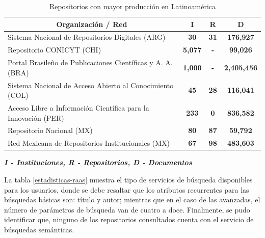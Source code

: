 \begin{table}[htbp]
\caption{Repositorios con mayor producci\'on en Latinoam\'erica}
\begin{tabular}{| p{9.5cm}| p{1.5cm} | p{1.5cm} | p{1.5cm} |}
\hline
\multicolumn{1}{|c|}{\textbf{Organizaci\'on / Red}}                                    & \multicolumn{1}{c|}{\textbf{I}}     & \multicolumn{1}{c|}{\textbf{R}}  & \multicolumn{1}{c|}{\textbf{D}}         \\ \hline
\multicolumn{1}{|l|}{Sistema Nacional de  Repositorios Digitales (ARG)}              & \multicolumn{1}{c|}{\textbf{30}}    & \multicolumn{1}{c|}{\textbf{31}} & \multicolumn{1}{c|}{\textbf{176,927}}   \\ \hline
\multicolumn{1}{|l|}{Repositorio CONICYT (CHI)}                                      & \multicolumn{1}{c|}{\textbf{5,077}} & \multicolumn{1}{c|}{\textbf{-}}  & \multicolumn{1}{c|}{\textbf{99,026}}    \\ \hline
\multicolumn{1}{|l|}{Portal Brasileño de  Publicaciones Cient\'ificas y  A. A. (BRA)}  & \multicolumn{1}{c|}{\textbf{1,000}} & \multicolumn{1}{c|}{\textbf{-}}  & \multicolumn{1}{c|}{\textbf{2,405,456}} \\ \hline
\multicolumn{1}{|l|}{Sistema Nacional de  Acceso Abierto al Conocimiento (COL)}      & \multicolumn{1}{c|}{\textbf{45}}    & \multicolumn{1}{c|}{\textbf{28}} & \multicolumn{1}{c|}{\textbf{116,041}}   \\ \hline
\multicolumn{1}{|l|}{Acceso Libre a Informaci\'on Cient\'ifica para la Innovaci\'on (PER)} & \multicolumn{1}{c|}{\textbf{233}}   & \multicolumn{1}{c|}{\textbf{0}}  & \multicolumn{1}{c|}{\textbf{836,582}}   \\ \hline
\multicolumn{1}{|l|}{Repositorio Nacional (MX)}                                      & \multicolumn{1}{c|}{\textbf{80}}    & \multicolumn{1}{c|}{\textbf{87}} & \multicolumn{1}{c|}{\textbf{59,792}}    \\ \hline
\multicolumn{1}{|l|}{Red Mexicana de  Repositorios Institucionales (MX)}             & \multicolumn{1}{c|}{\textbf{67}}    & \multicolumn{1}{c|}{\textbf{98}} & \multicolumn{1}{c|}{\textbf{483,603}}  \\ \hline
\end{tabular}
\label{produccion-raas}
\footnotesize{ \textbf{\textit{I - Instituciones, R - Repositorios, D - Documentos}}}
\end{table}

La tabla \ref{estadisticas-raas} muestra el tipo de servicios de b\'usqueda disponibles para los usuarios, donde se debe resaltar que los atributos recurrentes para las b\'usquedas b\'asicas son: t\'itulo y autor; mientras que en el caso de las avanzadas, el n\'umero de par\'ametros de b\'usqueda van de cuatro a doce. Finalmente, se pudo identificar que, ninguno de los repositorios consultados cuenta con el servicio de b\'usquedas sem\'anticas.\newline


